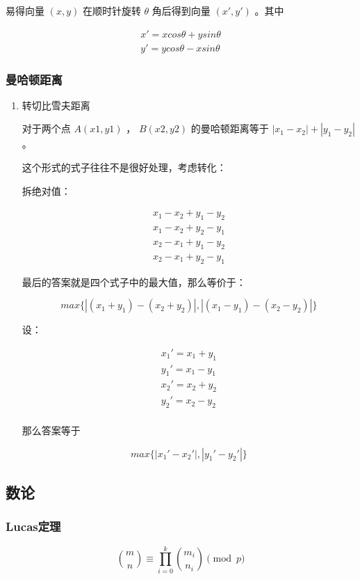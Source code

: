 \documentclass[11pt]{article}
\begin{document}
易得向量 $(x,y)$ 在顺时针旋转 $\theta$ 角后得到向量 $(x',y')$ 。其中

$$ \begin{aligned}
x'=xcos \theta+ysin\theta \\
y'=ycos \theta-xsin\theta
\end{aligned} $$

\subsubsection{曼哈顿距离}
\label{sec-3-2-2}
\begin{enumerate}
\item 转切比雪夫距离
\label{sec-3-2-2-1}

对于两个点 $A(x1,y1)$ ， $B(x2,y2)$ 的曼哈顿距离等于 $|x_1-x_2|+|y_1-y_2|$ 。  

这个形式的式子往往不是很好处理，考虑转化：

拆绝对值：

$$ \begin{aligned}
x_1-x_2+y_1-y_2 \\
x_1-x_2+y_2-y_1 \\
x_2-x_1+y_1-y_2 \\
x_2-x_1+y_2-y_1
\end{aligned} $$

最后的答案就是四个式子中的最大值，那么等价于：

$$
max\{|(x_1+y_1)-(x_2+y_2)|,|(x_1-y_1)-(x_2-y_2)|\}
$$

设：

$$ \begin{aligned}
x_1'=x_1+y_1 \\
y_1'=x_1-y_1 \\
x_2'=x_2+y_2 \\
y_2'=x_2-y_2 \\
\end{aligned} $$


那么答案等于

$$
max\{|x_1'-x_2'|,|y_1'-y_2'|\}
$$
\end{enumerate}

\subsection{数论}
\label{sec-3-3}
\subsubsection{Lucas定理}
\label{sec-3-3-1}

$${\binom {m}{n}}\equiv \prod _{i=0}^{k}{\binom {m_{i}}{n_{i}}}{\pmod {p}}$$
\end{document}
